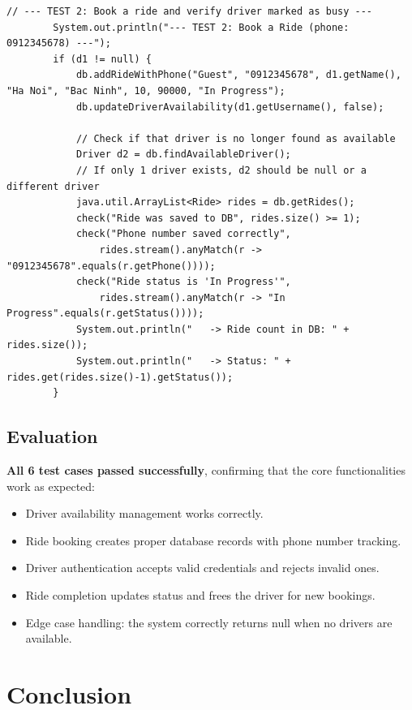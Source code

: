 \documentclass[fonts]{icst}
\begin{document}
\begin{lstlisting}[caption={Example test case -- booking a ride and verifying database state}]
        // --- TEST 2: Book a ride and verify driver marked as busy ---
        System.out.println("--- TEST 2: Book a Ride (phone: 0912345678) ---");
        if (d1 != null) {
            db.addRideWithPhone("Guest", "0912345678", d1.getName(), "Ha Noi", "Bac Ninh", 10, 90000, "In Progress");
            db.updateDriverAvailability(d1.getUsername(), false);

            // Check if that driver is no longer found as available
            Driver d2 = db.findAvailableDriver();
            // If only 1 driver exists, d2 should be null or a different driver
            java.util.ArrayList<Ride> rides = db.getRides();
            check("Ride was saved to DB", rides.size() >= 1);
            check("Phone number saved correctly", 
                rides.stream().anyMatch(r -> "0912345678".equals(r.getPhone())));
            check("Ride status is 'In Progress'", 
                rides.stream().anyMatch(r -> "In Progress".equals(r.getStatus())));
            System.out.println("   -> Ride count in DB: " + rides.size());
            System.out.println("   -> Status: " + rides.get(rides.size()-1).getStatus());
        }
\end{lstlisting}

\subsection{Evaluation}

\textbf{All 6 test cases passed successfully}, confirming that the core functionalities work as expected:

\begin{itemize}
    \item Driver availability management works correctly.
    \item Ride booking creates proper database records with phone number tracking.
    \item Driver authentication accepts valid credentials and rejects invalid ones.
    \item Ride completion updates status and frees the driver for new bookings.
    \item Edge case handling: the system correctly returns null when no drivers are available.
\end{itemize}


\section{Conclusion}\label{sec:conclusion}
\end{document}
